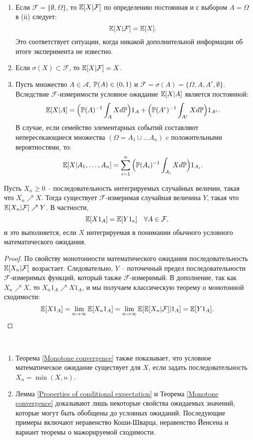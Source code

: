 \begin{exmp} \
	\begin{enumerate}
		\item Если $\mathcal{F}= \{\emptyset, \Omega \}$, то $\mathbb{E}[X|\mathcal{F}]$ по определению постоянная и с выбором $A=\Omega$ в (ii) следует:
		\[\mathbb{E}[X | \mathcal{F}]=\mathbb{E}[X]. \]
		Это соответствует ситуации, когда никакой дополнительной информации об итоге эксперимента не известно.
		\item Если $\sigma(X) \subset \mathcal{F}$, то $\mathbb{E}[X|\mathcal{F}]=X$.
		\item Пусть множество $A \in \mathcal{A}$, $\mathbb{P}(A) \in (0, 1)$ и $\mathcal{F}=\sigma(A)=\{\Omega, A, A^c, \emptyset \}$. Вследствие $\mathcal{F}$-измеримости условное ожидание $\mathbb{E}[X|A]$ является постоянной:
		\[\mathbb{E}[X|A]=\Big(\mathbb{P}(A)^{-1} \int_A X d\mathbb{P}\Big)1_A + \Big(\mathbb{P}(A^c)^{-1} \int_{A^c} X d\mathbb{P}\Big)1_{A^c}. \]
		В случае, если семейство элементарных событий составляют непересекающиеся множества $(\Omega = A_1 \cup \dots A_n)$ c положительными вероятностями, то:
		\[\mathbb{E}[X|A_1, \dots , A_n] = \sum_{i=1}^n \Big(\mathbb{P}(A_i)^{-1} \int_{A_i} X d\mathbb{P}\Big)1_{A_i}. \]
	\end{enumerate}
\end{exmp}

\begin{thm} \label{Monotone convergence}
	Пусть $X_n \geq 0$ -- последовательность интегрируемых случайных величин, такая что $X_n \nearrow X$. Тогда существует $\mathcal{F}$-измеримая случайная величина $Y$, такая что $\mathbb{E}[X_n|\mathcal{F}] \nearrow Y$. В частности,
	\[ \mathbb{E}[X1_A]=\mathbb{E}[Y1_a] \quad \forall A \in \mathcal{F}, \]
	и это выполняется, если $X$ интегрируемая в понимании обычного условного математического ожидания.
\end{thm}

\begin{proof}
	По свойству монотонности математического ожидания последовательность $\mathbb{E}[X_n|\mathcal{F}]$ возрастает. Следовательно, $Y$ -- поточечный предел последовательности $\mathcal{F}$-измеримых функций, который также $\mathcal{F}$-измеримый. В дополнение, так как $X_n \nearrow X$, то $X_n1_A \nearrow X1_A$, и мы получаем классическую теорему о монотонной сходимости:
	\[ \mathbb{E}[X1_A]=\lim\limits_{n \rightarrow \infty}\mathbb{E}[X_n1_A]=\lim\limits_{n \rightarrow \infty}\mathbb{E}[\mathbb{E}[X_n|\mathcal{F}]|1_A]=\mathbb{E}[Y1_A]. \]
\end{proof}

\begin{rmrk} \
	\begin{enumerate}
		\item Теорема \ref{Monotone convergence} также показывает, что условное математическое ожидание существует для $X$, если задать последовательность $X_n=\min(X,n)$.
		\item Лемма \ref{Properties of conditional expectation} и Теорема \ref{Monotone convergence} доказывают лишь некоторые свойства ожидаемых значений, которые могут быть обобщены до условных ожиданий. Последующие примеры включают неравенство Коши-Шварца, неравенство Йенсена и вариант теоремы о мажорируемой сходимости.
	\end{enumerate}
\end{rmrk}

